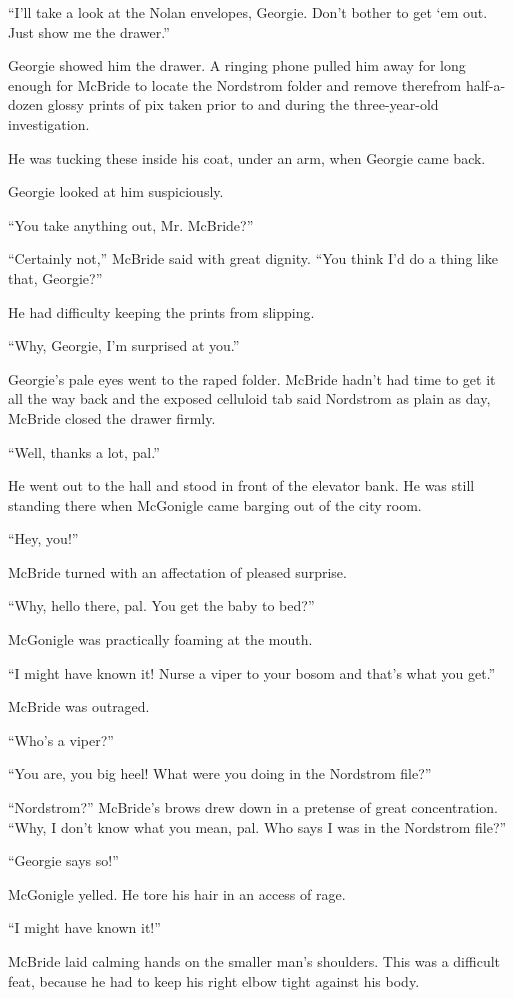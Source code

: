 \documentclass{novel}
\begin{document}
“I’ll take a look at the Nolan envelopes, Georgie. Don’t bother to get ‘em out. Just show me the drawer.”

Georgie showed him the drawer. A ringing phone pulled him away for long enough for McBride to locate the Nordstrom folder and remove therefrom half-a-dozen glossy prints of pix taken prior to and during the three-year-old investigation.

He was tucking these inside his coat, under an arm, when Georgie came back.

Georgie looked at him suspiciously.

“You take anything out, Mr. McBride?”

“Certainly not,” McBride said with great dignity. “You think I’d do a thing like that, Georgie?”

He had difficulty keeping the prints from slipping.

“Why, Georgie, I’m surprised at you.”

Georgie’s pale eyes went to the raped folder. McBride hadn’t had time to get it all the way back and the exposed celluloid tab said Nordstrom as plain as day, McBride closed the drawer firmly.

“Well, thanks a lot, pal.”

He went out to the hall and stood in front of the elevator bank. He was still standing there when McGonigle came barging out of the city room.

“Hey, you!”

McBride turned with an affectation of pleased surprise.

“Why, hello there, pal. You get the baby to bed?”

McGonigle was practically foaming at the mouth.

“I might have known it! Nurse a viper to your bosom and that’s what you get.”

McBride was outraged. 

“Who’s a viper?”

“You are, you big heel! What were you doing in the Nordstrom file?”

“Nordstrom?” McBride’s brows drew down in a pretense of great concentration. “Why, I don’t know what you mean, pal. Who says I was in the Nordstrom file?”

“Georgie says so!”

McGonigle yelled. He tore his hair in an access of rage.

“I might have known it!”

McBride laid calming hands on the smaller man’s shoulders. This was a difficult feat, because he had to keep his right elbow tight against his body.
\end{document}
